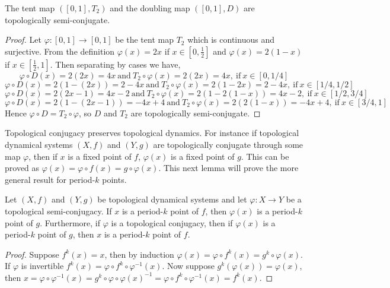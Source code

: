 \begin{prop} \label{prop:tent-doubling-semi-conjugate}
    The tent map $([0, 1], T_2)$ and the doubling map $([0, 1], D)$ are topologically semi-conjugate.
    \begin{proof}
        Let $\varphi: [0, 1] \to [0, 1]$ be the tent map $T_2$ which is continuous and surjective. From the definition $\varphi(x) = 2x$ if $x \in \left[0, \frac{1}{2}\right]$ and $\varphi(x) = 2(1-x)$ if $x \in \left[\frac{1}{2}, 1\right]$. Then separating by cases we have, \[\varphi \circ D(x) = 2(2x) = 4x \ \text{and} \ T_2 \circ \varphi(x) = 2(2x) = 4x, \ \text{if} \ x \in \left[0, 1/4\right]\] \[\varphi \circ D(x) = 2(1 - (2x)) = 2 - 4x \ \text{and} \ T_2 \circ \varphi(x) = 2(1-2x) = 2 - 4x, \ \text{if} \ x \in \left[1/4, 1/2\right]\] \[\varphi \circ D(x) = 2(2x-1) = 4x - 2 \ \text{and} \ T_2 \circ \varphi(x) = 2(1-2(1-x)) = 4x - 2, \ \text{if} \ x \in \left[1/2, 3/4\right]\] \[\varphi \circ D(x) = 2(1-(2x - 1)) = - 4x + 4 \ \text{and} \ T_2 \circ \varphi(x) = 2(2(1-x)) = -4x + 4, \ \text{if} \ x \in \left[3/4, 1\right]\] Hence $\varphi \circ D = T_2 \circ \varphi$, so $D$ and $T_2$ are topologically semi-conjugate.
    \end{proof}
\end{prop}

Topological conjugacy preserves topological dynamics. For instance if topological dynamical systems $(X, f)$ and $(Y, g)$ are topologically conjugate through some map $\varphi$, then if $x$ is a fixed point of $f$, $\varphi(x)$ is a fixed point of $g$. This can be proved as $\varphi(x) = \varphi \circ f(x) = g \circ \varphi(x)$. This next lemma will prove the more general result for period-$k$ points.

\begin{prop} \label{prop:conjugacy-preserves-periodic-points}
    Let $(X, f)$ and $(Y, g)$ be topological dynamical systems and let $\varphi: X \to Y$ be a topological semi-conjugacy. If $x$ is a period-$k$ point of $f$, then $\varphi(x)$ is a period-$k$ point of $g$. Furthermore, if $\varphi$ is a topological conjugacy, then if $\varphi(x)$ is a period-$k$ point of $g$, then $x$ is a period-$k$ point of $f.$
    \begin{proof}
        Suppose $f^k(x) = x$, then by induction $\varphi(x) = \varphi \circ f^k(x) = g^k \circ \varphi (x)$. If $\varphi$ is invertible $f^k(x) = \varphi \circ f^k \circ \varphi^{-1}(x)$. Now suppose $g^k(\varphi(x)) = \varphi(x)$, then $x = \varphi \circ \varphi^{-1}(x) = g^k \circ \varphi \circ \varphi(x)^{-1} = \varphi \circ f^k \circ \varphi^{-1}(x) = f^k(x)$.
    \end{proof}
\end{prop}

